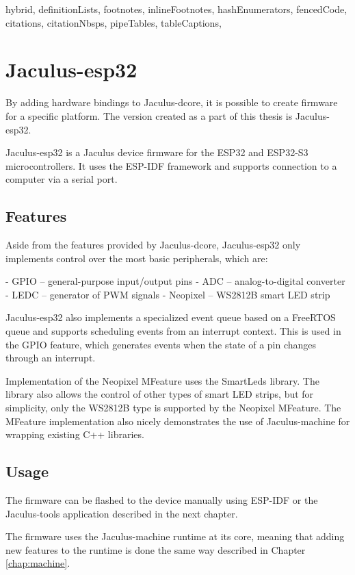 \begin{markdown*}{%
  hybrid,
  definitionLists,
  footnotes,
  inlineFootnotes,
  hashEnumerators,
  fencedCode,
  citations,
  citationNbsps,
  pipeTables,
  tableCaptions,
}

\chapter{Jaculus-esp32}

By adding hardware bindings to Jaculus-dcore, it is possible to create firmware for a specific platform. The version created as a part of this thesis is Jaculus-esp32.

Jaculus-esp32 is a Jaculus device firmware for the ESP32 and ESP32-S3 microcontrollers. It uses the ESP-IDF framework and supports connection to a computer via a serial port.

\section{Features}

Aside from the features provided by Jaculus-dcore, Jaculus-esp32 only implements control over the most basic peripherals, which are:

  - GPIO -- general-purpose input/output pins
  - ADC -- analog-to-digital converter
  - LEDC -- generator of PWM signals
  - Neopixel -- WS2812B smart LED strip

Jaculus-esp32 also implements a specialized event queue based on a FreeRTOS queue and supports scheduling events from an interrupt context. This is used in the GPIO feature, which generates events when the state of a pin changes through an interrupt.

Implementation of the Neopixel MFeature uses the SmartLeds\cite{smartleds} library. The library also allows the control of other types of smart LED strips, but for simplicity, only the WS2812B type is supported by the Neopixel MFeature. The MFeature implementation also nicely demonstrates the use of Jaculus-machine for wrapping existing C++ libraries.

\section{Usage}

The firmware can be flashed to the device manually using ESP-IDF or the Jaculus-tools application described in the next chapter.

The firmware uses the Jaculus-machine runtime at its core, meaning that adding new features to the runtime is done the same way described in Chapter \ref{chap:machine}.


\end{markdown*}
